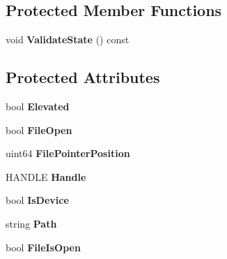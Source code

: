 \subsection*{Protected Member Functions}
\begin{DoxyCompactItemize}
\item 
\mbox{\label{class_gost_crypt_1_1_file_ac5aab85ff90dac85e0a3aefabbc2176d}} 
void {\bfseries Validate\+State} () const
\end{DoxyCompactItemize}
\subsection*{Protected Attributes}
\begin{DoxyCompactItemize}
\item 
\mbox{\label{class_gost_crypt_1_1_file_ab52155d16d3ff12c88f4b0050826c3d9}} 
bool {\bfseries Elevated}
\item 
\mbox{\label{class_gost_crypt_1_1_file_a47cdca56d489fa0c7cebc185aff9a80e}} 
bool {\bfseries File\+Open}
\item 
\mbox{\label{class_gost_crypt_1_1_file_a38b985fa8320ed233d0e61589671a33d}} 
uint64 {\bfseries File\+Pointer\+Position}
\item 
\mbox{\label{class_gost_crypt_1_1_file_a5c92492806c53c33c8e2e9ef0f8e229c}} 
H\+A\+N\+D\+LE {\bfseries Handle}
\item 
\mbox{\label{class_gost_crypt_1_1_file_a03af04f719471d24ad9be343731b5ac5}} 
bool {\bfseries Is\+Device}
\item 
\mbox{\label{class_gost_crypt_1_1_file_aec95b11e71e6b0199cf64fcc796f6322}} 
string {\bfseries Path}
\item 
\mbox{\label{class_gost_crypt_1_1_file_ab2d0811dbea8ba9f1a3b90d4a0dee75a}} 
bool {\bfseries File\+Is\+Open}
\item 
\mbox{\label{class_gost_crypt_1_1_file_ae7d0c979b4c4d6e919580cea1102a3ba}} 

\end{DoxyCompactItemize}
